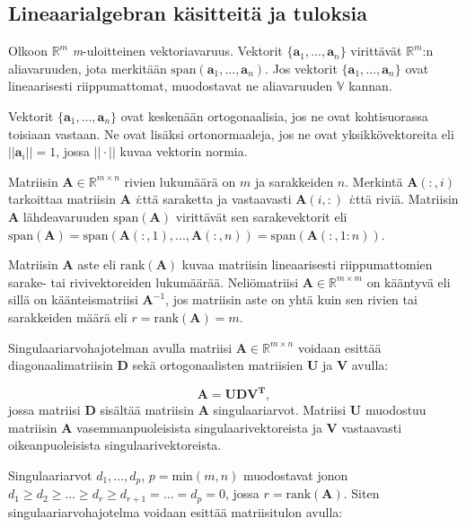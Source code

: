 \subsection{Lineaarialgebran käsitteitä ja tuloksia}

Olkoon $\mathbb{R}^m$ \textit{m}-uloitteinen vektoriavaruus. Vektorit $\{\mathbf{a}_1,...,\mathbf{a}_n\}$ virittävät $\mathbb{R}^m$:n aliavaruuden, jota merkitään $\text{span}(\mathbf{a}_1,...,\mathbf{a}_n)$. Jos vektorit $\{\mathbf{a}_1,...,\mathbf{a}_n\}$ ovat lineaarisesti riippumattomat, muodostavat ne aliavaruuden $\mathbb{V}$ kannan.

Vektorit $\{\mathbf{a}_1,...,\mathbf{a}_n\}$ ovat keskenään ortogonaalisia, jos ne ovat kohtisuorassa toisiaan vastaan. Ne ovat lisäksi ortonormaaleja, jos ne ovat yksikkövektoreita eli $||\mathbf{a}_i||=1$, jossa $||\cdot||$ kuvaa vektorin normia.

Matriisin $\mathbf{A}\in \mathbb{R}^{m\times n}$ rivien lukumäärä on $\mathit{m}$ ja sarakkeiden $\mathit{n}$. Merkintä $\mathbf{A}(:,i)$ tarkoittaa matriisin \textbf{A} \textit{i}:ttä saraketta ja vastaavasti $\mathbf{A}(i,:)$ \textit{i}:ttä riviä. Matriisin \textbf{A} lähdeavaruuden $\text{span}(\mathbf{A})$ virittävät sen sarakevektorit eli $\text{span}(\mathbf{A}) = \text{span}(\mathbf{A}(:,1),...,\mathbf{A}(:,n)) = \text{span}(\mathbf{A}(:,1:n))$. 

Matriisin \textbf{A} aste eli $\text{rank}(\mathbf{A})$ kuvaa matriisin lineaarisesti riippumattomien sarake- tai rivivektoreiden lukumäärää. Neliömatriisi $\mathbf{A}\in \mathbb{R}^{m\times m}$ on kääntyvä eli sillä on käänteismatriisi $\mathbf{A}^{-1}$, jos matriisin aste on yhtä kuin sen rivien tai sarakkeiden määrä eli $r = \text{rank}(\textbf{A})=m$.

Singulaariarvohajotelman avulla matriisi $\mathbf{A}\in \mathbb{R}^{m\times n}$ voidaan esittää diagonaalimatriisin \textbf{D} sekä ortogonaalisten matriisien \textbf{U} ja \textbf{V} avulla:

\begin{equation}
    \mathbf{A = UDV^T,}
    \label{eq:svd}
\end{equation}
jossa matriisi \textbf{D} sisältää matriisin \textbf{A} singulaariarvot. Matriisi \textbf{U} muodostuu matriisin \textbf{A} vasemmanpuoleisista singulaarivektoreista ja \textbf{V} vastaavasti oikeanpuoleisista singulaarivektoreista.

Singulaariarvot $d_1,...,d_p$, $p=\text{min}(m,n)$ muodostavat jonon $d_1 \geq d_2 \geq ... \geq d_r \geq d_{r+1} = ... = d_p = 0$, jossa $r = \text{rank}(\mathbf{A})$. Siten singulaariarvohajotelma voidaan esittää matriisitulon avulla: 

